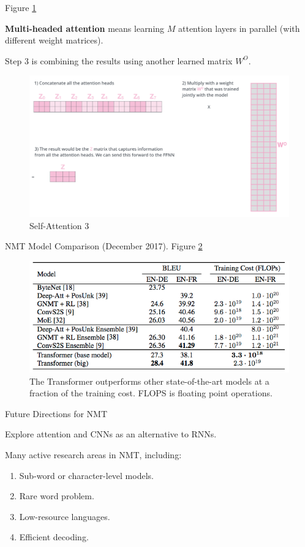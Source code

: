 \documentclass[english]{article}
\begin{document}
\item  Figure \ref{Self-Attention 3}

\textbf{Multi-headed attention} means learning $M$ attention layers in parallel (with different weight matrices).

Step 3 is combining the results using another learned matrix $W^O$.
\begin{figure}
\centering
\includegraphics[width=1\linewidth]{self-attention3.png}
    \caption{Self-Attention 3}
    \label{Self-Attention 3}
\end{figure} 
 

\item 
 {NMT Model Comparison (December 2017)}.  Figure \ref{TheT}

\begin{figure}
\centering
\includegraphics[height=0.3\linewidth]{nmt-compare2.png}
\caption{The Transformer outperforms other state-of-the-art models at a fraction of the training cost. FLOPS is floating point operations.}
\label{TheT}
\end{figure}
 

\item 
 {Future Directions for NMT}

Explore attention and CNNs as an alternative to RNNs.
 
Many active research areas in NMT, including:
\begin{enumerate}
\item Sub-word or character-level models.
\item Rare word problem.
\item Low-resource languages.
\item Efficient decoding.
\end{enumerate}
\end{document}
